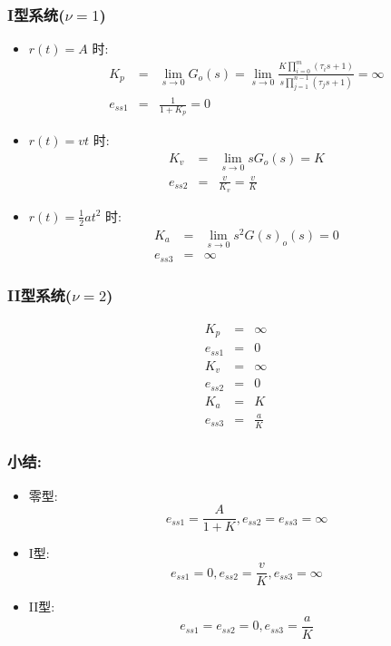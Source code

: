 \documentclass{article}
\begin{document}
\begin{frame}
\frametitle{I型系统($\nu=1$)}
\label{sec-3-2-7}

\begin{itemize}
\item <2->$r(t)=A$ 时:
      \begin{eqnarray*}
      K_p &=& \lim_{s\rightarrow 0}G_o(s) 
	  = \lim_{s\rightarrow 0}\frac{K\prod_{i=0}^m(\tau_i s+1)}{s\prod_{j=1}^{n-1}(\tau_j s+1)} 
	  = \infty \\
      e_{ss1} &=& \frac{1}{1+K_p}
	    = 0
      \end{eqnarray*}
\item <3->$r(t)=vt$ 时:
      \begin{eqnarray*}
      K_v &=& \lim_{s\rightarrow 0}sG_o(s) 
	  = K \\
      e_{ss2} &=& \frac{v}{K_v} 
	      =\frac{v}{K}
      \end{eqnarray*}
\item <4->$r(t)=\frac{1}{2}at^2$ 时:
      \begin{eqnarray*}
      K_a &=& \lim_{s\rightarrow 0}s^2 G(s)_o(s) 
	  = 0 \\
      e_{ss3} &=& \infty
      \end{eqnarray*}
\end{itemize}
\end{frame}
\begin{frame}
\frametitle{II型系统($\nu=2$)}
\label{sec-3-2-8}

\begin{eqnarray*}
K_p & = & \infty\\
e_{ss1} &=& 0 \\
K_v & = & \infty \\
e_{ss2} &=& 0 \\
K_a &=& K \\
e_{ss3} &=& \frac{a}{K}
\end{eqnarray*}
\end{frame}
\begin{frame}
\frametitle{小结:}
\label{sec-3-2-9}

\begin{itemize}
\item <2->零型:
      \[e_{ss1}=\frac{A}{1+K},e_{ss2}=e_{ss3}=\infty\]
\item <3->I型:
      \[e_{ss1}=0,e_{ss2}=\frac{v}{K},e_{ss3}=\infty\]
\item <4->II型:
      \[e_{ss1}=e_{ss2}=0,e_{ss3}=\frac{a}{K}\]
\end{itemize}
\end{frame}
\end{document}

